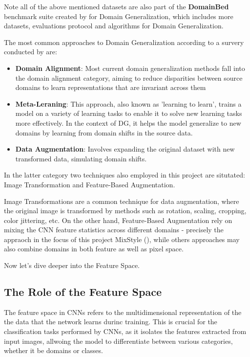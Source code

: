 Note all of the above mentioned datasets are also part of the \textbf{DomainBed} benchmark suite created by \cite{gulrajaniSearchLostDomain2020} for Domain Generalization, which includes more datasets, evaluations protocol and algorithms for Domain Generalization.




The most common approaches to Domain Generalization according to a survery conducted by \cite{zhouDomainGeneralizationSurvey2022} are:
\begin{itemize}
 \item \textbf{Domain Alignment}: Most current domain generalization methods fall into the domain alignment category, aiming to reduce disparities between source domains to learn representations that are invariant across them
 \item \textbf{Meta-Leraning}: This approach, also known as 'learning to learn', trains a model on a variety of learning tasks to enable it to solve new learning tasks more effectively. In the context of DG, it helps the model generalize to new domains by learning from domain shifts in the source data.
 \item \textbf{Data Augmentation}: Involves expanding the original dataset with new transformed data, simulating domain shifts.
\end{itemize}

In the latter category two techniques also employed in this project are situtated:
Image Transformation and Feature-Based Augmentation.

Image Transformations are a common technique for data augmentation, where the original image is transformed by methods such as rotation, scaling, cropping, color jittering, etc.
On the other hand, Feature-Based Augmentation rely on mixing the CNN feature statistics across different domains - precisely the appraoch in the focus of this project MixStyle (\cite{zhouMixStyleNeuralNetworks2023}), while others approaches may also combine domains in both feature as well as pixel space.

Now let's dive deeper into the Feature Space.
\subsection{The Role of the Feature Space}
The feature space in CNNs refers to the multidimensional representation of the the data that the network learns durinc training. This is crucial for the classification tasks performed by CNNs, as it isolates the features extracted from input images, allwoing the model to differentiate between various categories, whether it be domains or classes.

